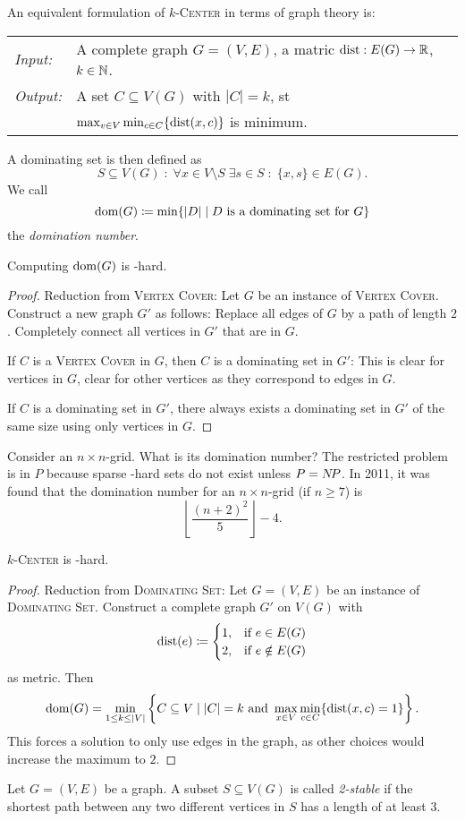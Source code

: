 \documentclass[../skript.tex]{subfiles}
\begin{document}
An equivalent formulation of \textsc{$k$-Center} in terms of graph theory is:
\begin{problem}[$k$-Center]
\begin{tabular}{ll}
\textit{Input:} & A complete graph $G = (V, E)$, a matric $\operatorname*{dist} : E(G) \to \mathbb{R}$, $k \in \mathbb{N}$. \\
\textit{Output:} & A set $C \subseteq V(G)$ with $|C| = k$, \ac{st} \\
&$\max_{v \in V} \min_{c \in C} \{\operatorname*{dist}(x, c)\}$ is minimum.
\end{tabular}
\end{problem}
A dominating set is then defined as
\[
	S \subseteq V(G) \; : \; \forall x \in V \setminus S \; \exists s \in S \; : \; \{ x, s \} \in E(G).
\]
We call
\[
	\operatorname{dom}(G) \coloneqq \min \{ |D| \mid D \text{ is a dominating set for } G \}
\]
the \emph{domination number}.
\begin{theorem} %
\label{thm:23}
Computing $\operatorname{dom}(G)$ is \NP-hard.
\end{theorem}
\begin{proof}
Reduction from \textsc{Vertex Cover}: Let $G$ be an instance of \textsc{Vertex Cover}.
Construct a new graph $G'$ as follows: Replace all edges of $G$ by a path of length $2$.
Completely connect all vertices in $G'$ that are in $G$.

If $C$ is a \textsc{Vertex Cover} in $G$, then $C$ is a dominating set in $G'$: This is clear for vertices in $G$, clear for other vertices as they correspond to edges in $G$.

If $C$ is a dominating set in $G'$, there always  exists a dominating set in $G'$ of the same size using only vertices in $G$.
\end{proof}
Consider an $n \times n$-grid. What is its domination number? The restricted problem is in $P$ because sparse \NP-hard sets do not exist unless $P = N \! P$.
In 2011, it was found that the domination number for an $n \times n$-grid (if $n \geq 7$) is
\[
	\left\lfloor \frac{(n+2)^2}{5} \right\rfloor - 4.
\]
\begin{theorem} %
\label{thm:24}
\textsc{$k$-Center} is \NP-hard.
\end{theorem}
\begin{proof}
Reduction from \textsc{Dominating Set}: Let $G = (V, E)$ be an instance of \textsc{Dominating Set}.
Construct a complete graph $G'$ on $V(G)$ with
\[
\operatorname*{dist}(e) \coloneqq \begin{cases}
1, & \text{if } e \in E(G) \\
2, & \text{if } e \notin E(G)
\end{cases}
\]
as metric.
Then
\[
	\operatorname{dom}(G) = \min_{1 \leq k \leq |V|} \left\{ C \subseteq V \mid |C| = k \text{ and } \max_{x \in V} \min_{c \in C} \{ \operatorname*{dist}(x, c) = 1 \} \right\}.
\]
This forces a solution to only use edges in the graph, as other choices would increase the maximum to $2$.
\end{proof}
Let $G = (V, E)$ be a graph. A subset $S \subseteq V(G)$ is called \emph{2-stable} if the shortest path between any two different vertices in $S$ has a length of at least $3$.
\end{document}
